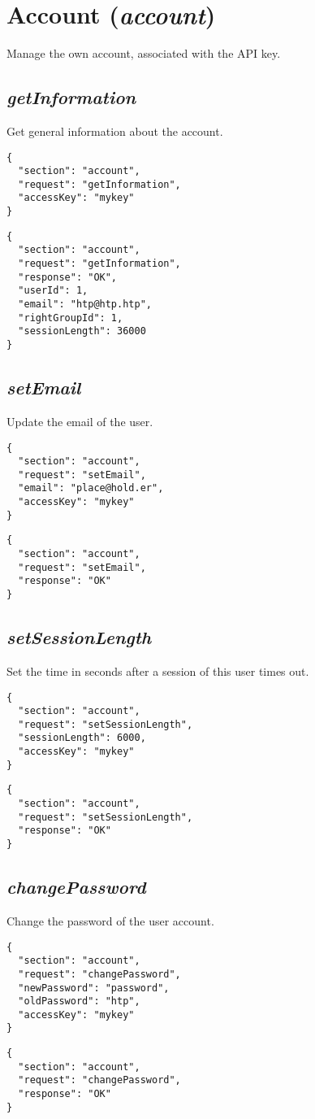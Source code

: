 \section*{Account (\textit{account})}
	Manage the own account, associated with the API key.

\subsection*{\textit{getInformation}}
	Get general information about the account.
	{
		\color{blue}
		\begin{verbatim}
{
  "section": "account",
  "request": "getInformation",
  "accessKey": "mykey"
}
		\end{verbatim}
	}
	{
		\color{OliveGreen}
		\begin{verbatim}
{
  "section": "account",
  "request": "getInformation",
  "response": "OK",
  "userId": 1,
  "email": "htp@htp.htp",
  "rightGroupId": 1,
  "sessionLength": 36000
}
		\end{verbatim}
	}
\subsection*{\textit{setEmail}}
	Update the email of the user.
	{
		\color{blue}
		\begin{verbatim}
{
  "section": "account",
  "request": "setEmail",
  "email": "place@hold.er",
  "accessKey": "mykey"
}
		\end{verbatim}
	}
	{
		\color{OliveGreen}
		\begin{verbatim}
{
  "section": "account",
  "request": "setEmail",
  "response": "OK"
}
		\end{verbatim}
	}
\subsection*{\textit{setSessionLength}}
	Set the time in seconds after a session of this user times out.
	{
		\color{blue}
		\begin{verbatim}
{
  "section": "account",
  "request": "setSessionLength",
  "sessionLength": 6000,
  "accessKey": "mykey"
}
		\end{verbatim}
	}
	{
		\color{OliveGreen}
		\begin{verbatim}
{
  "section": "account",
  "request": "setSessionLength",
  "response": "OK"
}
		\end{verbatim}
	}
\subsection*{\textit{changePassword}}
	Change the password of the user account.
	{
		\color{blue}
		\begin{verbatim}
{
  "section": "account",
  "request": "changePassword",
  "newPassword": "password",
  "oldPassword": "htp",
  "accessKey": "mykey"
}
		\end{verbatim}
	}
	{
		\color{OliveGreen}
		\begin{verbatim}
{
  "section": "account",
  "request": "changePassword",
  "response": "OK"
}
		\end{verbatim}
	}


